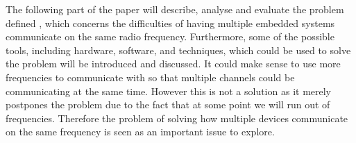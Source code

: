 \bigskip
The following part of the paper will describe, analyse and evaluate the problem defined , which concerns the difficulties of having multiple embedded systems communicate on the same radio frequency.
Furthermore, some of the possible tools, including hardware, software, and techniques, which could be used to solve the problem will be introduced and discussed.
It could make sense to use more frequencies to communicate with so that multiple channels could be communicating at the same time.
However this is not a solution as it merely postpones the problem due to the fact that at some point we will run out of frequencies. 
Therefore the problem of solving how multiple devices communicate on the same frequency is seen as an important issue to explore.